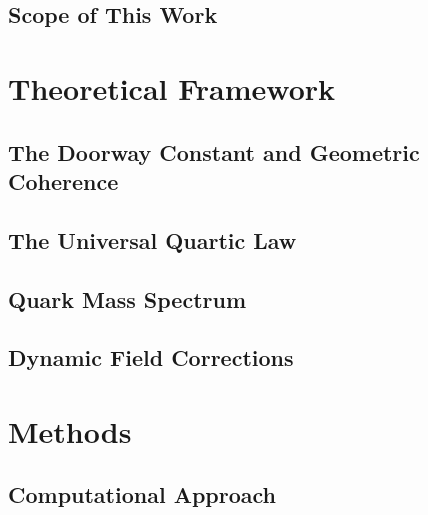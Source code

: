\documentclass[11pt,a4paper]{article}
\begin{document}
\subsection{Scope of This Work}

\section{Theoretical Framework}

\subsection{The Doorway Constant and Geometric Coherence}

\subsection{The Universal Quartic Law}

\subsection{Quark Mass Spectrum}

\subsection{Dynamic Field Corrections}

\section{Methods}

\subsection{Computational Approach}
\end{document}
